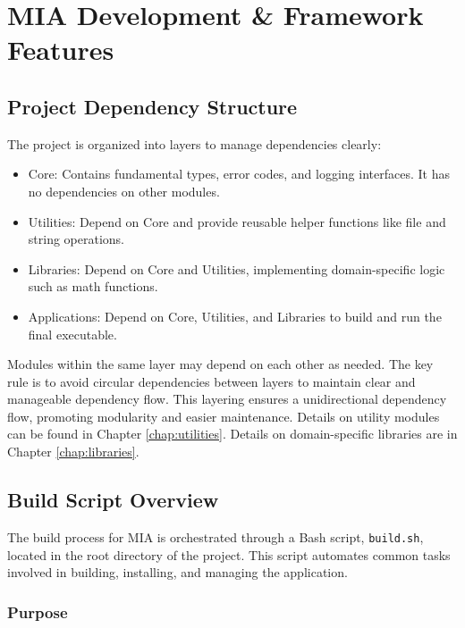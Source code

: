 \chapter{MIA Development \& Framework Features}
\pagestyle{fancy}






\section{Project Dependency Structure}
\label{sec:dependancy-structure}

The project is organized into layers to manage dependencies clearly:
\begin{itemize}
\item Core: Contains fundamental types, error codes, and logging interfaces. It has no dependencies on other modules.
\item Utilities: Depend on Core and provide reusable helper functions like file and string operations.
\item Libraries: Depend on Core and Utilities, implementing domain-specific logic such as math functions.
\item Applications: Depend on Core, Utilities, and Libraries to build and run the final executable.
\end{itemize}
Modules within the same layer may depend on each other as needed. The key rule is to avoid circular dependencies between layers to maintain clear and manageable dependency flow. This layering ensures a unidirectional dependency flow, promoting modularity and easier maintenance. Details on utility modules can be found in Chapter \ref{chap:utilities}. Details on domain-specific libraries are in Chapter \ref{chap:libraries}.







\section{Build Script Overview}
\label{sec:build-script}

The build process for MIA is orchestrated through a Bash script, \texttt{build.sh}, located in the root directory of the project. This script automates common tasks involved in building, installing, and managing the application.

\subsection{Purpose}

